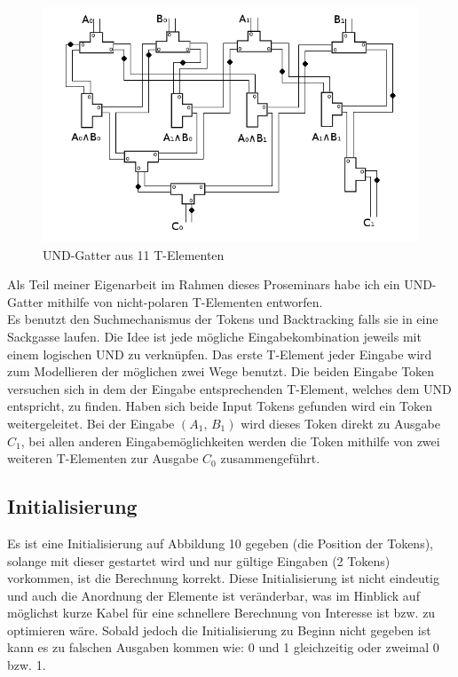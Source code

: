\documentclass[11pt,a4paper]{article}
\begin{document}
\begin{figure}[h]
    \centering
    \includegraphics[width=12cm]{bilder/UndUnd.png}
    \caption{UND-Gatter aus 11 T-Elementen}
\end{figure}    

Als Teil meiner Eigenarbeit im Rahmen dieses Proseminars habe ich ein UND-Gatter
mithilfe von nicht-polaren T-Elementen entworfen. \\
%
Es benutzt den Suchmechanismus der Tokens und Backtracking falls sie in eine 
Sackgasse laufen. 
%
Die Idee ist jede mögliche Eingabekombination jeweils mit einem 
logischen UND zu verknüpfen. 
%
Das erste T-Element jeder Eingabe wird zum Modellieren
der möglichen zwei Wege benutzt.
%
Die beiden Eingabe Token versuchen sich in dem der Eingabe entsprechenden
T-Element, welches dem UND entspricht, zu finden.
%
Haben sich beide Input Tokens gefunden wird ein Token weitergeleitet.
Bei der Eingabe $ (A_{1},\, B_{1}) $ wird dieses Token direkt zu Ausgabe
$ C_{1} $, bei allen anderen Eingabemöglichkeiten werden die Token mithilfe
von zwei weiteren T-Elementen zur Ausgabe $ C_{0} $ zusammengeführt. 


\subsection{Initialisierung}
Es ist eine Initialisierung auf Abbildung 10 gegeben (die Position der Tokens), 
solange mit dieser gestartet wird und nur gültige Eingaben (2 Tokens) 
vorkommen, ist die Berechnung korrekt.
%
Diese Initialisierung ist nicht eindeutig und auch die Anordnung der
Elemente ist veränderbar, was im Hinblick auf möglichst kurze Kabel 
für eine schnellere Berechnung von Interesse ist bzw. zu optimieren wäre.
%
Sobald jedoch die Initialisierung zu Beginn nicht gegeben ist kann es zu 
falschen Ausgaben kommen wie: 0 und 1 gleichzeitig oder zweimal 0 bzw. 1. 
\end{document}
